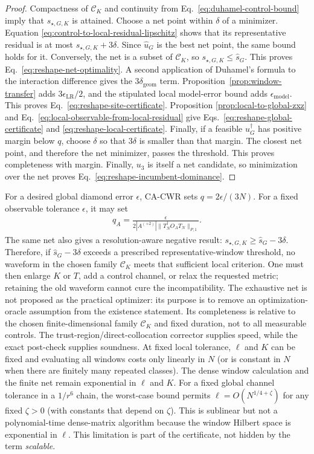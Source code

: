 \begin{proof}
Compactness of $\mathcal C_K$ and continuity from
Eq.~\eqref{eq:duhamel-control-bound} imply that $s_{\star,G,K}$ is attained.
Choose a net point within $\delta$ of a minimizer.  Equation
\eqref{eq:control-to-local-residual-lipschitz} shows that its representative
residual is at most $s_{\star,G,K}+3\delta$.  Since $\widehat u_G$ is the best
net point, the same bound holds for it.  Conversely, the net is a subset of
$\mathcal C_K$, so $s_{\star,G,K}\leq\widehat s_G$.  This proves
Eq.~\eqref{eq:reshape-net-optimality}.  A second application of Duhamel's
formula to the interaction difference gives the
$3\delta_{\mathrm{geom}}$ term.  Proposition~\ref{prop:window-transfer} adds
$3\epsilon_{\mathrm{LR}}/2$, and the stipulated local model-error bound adds
$\epsilon_{\mathrm{model}}$.  This proves
Eq.~\eqref{eq:reshape-site-certificate}.  Proposition
\ref{prop:local-to-global-zxz} and
Eq.~\eqref{eq:local-observable-from-local-residual} give
Eqs.~\eqref{eq:reshape-global-certificate} and
\eqref{eq:reshape-local-certificate}.  Finally, if a feasible
$u_G^\dagger$ has positive margin below $q$, choose $\delta$ so that
$3\delta$ is smaller than that margin.  The closest net point, and therefore
the net minimizer, passes the threshold.  This proves completeness with
margin.  Finally, $u_3$ is itself a net candidate, so minimization over the
net proves Eq.~\eqref{eq:reshape-incumbent-dominance}.
\end{proof}

For a desired global diamond error $\epsilon$, CA-CWR sets
$q=2\epsilon/(3N)$.  For a fixed observable tolerance $\epsilon$, it may set
\begin{align}
q_A=\frac{\epsilon}
{2|A^{(+2)}|\|T_N^\dagger O_AT_N\|_{P,1}}.
\end{align}
The same net also gives a resolution-aware negative result:
$s_{\star,G,K}\geq\widehat s_G-3\delta$.  Therefore, if
$\widehat s_G-3\delta$ exceeds a prescribed representative-window threshold,
no waveform in the chosen family $\mathcal C_K$ meets that sufficient local
criterion.  One must then enlarge $K$ or $T$, add a control channel, or relax
the requested metric; retaining the old waveform cannot cure the
incompatibility.
The exhaustive net is not proposed as the practical optimizer: its purpose is
to remove an optimization-oracle assumption from the existence statement.
Its completeness is relative to the chosen finite-dimensional family
$\mathcal C_K$ and fixed duration, not to all measurable controls.
The trust-region/direct-collocation corrector supplies speed, while the exact
post-check supplies soundness.  At fixed local tolerance, $\ell$ and $K$ can
be fixed and evaluating all windows costs only linearly in $N$ (or is
constant in $N$ when there are finitely many repeated classes).  The dense
window calculation and the finite net remain exponential in $\ell$ and $K$.
For a fixed global channel tolerance in a $1/r^6$ chain, the worst-case
bound permits $\ell=O(N^{1/4+\zeta})$ for any fixed $\zeta>0$ (with constants
that depend on $\zeta$).  This is sublinear but not a polynomial-time
dense-matrix algorithm because the window Hilbert space is exponential in
$\ell$.  This limitation is part of the certificate, not hidden by the term
\emph{scalable}.


